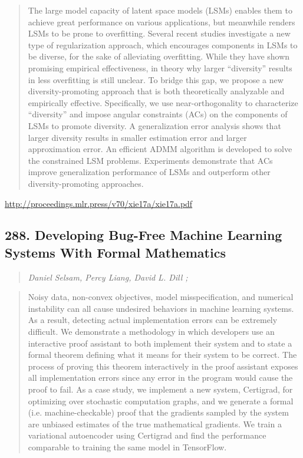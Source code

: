 \documentclass{article}
\begin{document}
\begin{quote}
    The large model capacity of latent space models (LSMs) enables them to achieve great performance on various applications, but meanwhile renders LSMs to be prone to overfitting. Several recent studies investigate a new type of regularization approach, which encourages components in LSMs to be diverse, for the sake of alleviating overfitting. While they have shown promising empirical effectiveness, in theory why larger “diversity” results in less overfitting is still unclear. To bridge this gap, we propose a new diversity-promoting approach that is both theoretically analyzable and empirically effective. Specifically, we use near-orthogonality to characterize “diversity” and impose angular constraints (ACs) on the components of LSMs to promote diversity. A generalization error analysis shows that larger diversity results in smaller estimation error and larger approximation error. An efficient ADMM algorithm is developed to solve the constrained LSM problems. Experiments demonstrate that ACs improve generalization performance of LSMs and outperform other diversity-promoting approaches.  \end{quote}

\href{http://proceedings.mlr.press/v70/xie17a/xie17a.pdf}{http://proceedings.mlr.press/v70/xie17a/xie17a.pdf}

\subsection{288. Developing Bug-Free Machine Learning Systems With Formal Mathematics}

\begin{quote}
\footnotesize{\textit{Daniel Selsam, Percy Liang, David L. Dill ;}}
\end{quote}

\begin{quote}
    Noisy data, non-convex objectives, model misspecification, and numerical instability can all cause undesired behaviors in machine learning systems. As a result, detecting actual implementation errors can be extremely difficult. We demonstrate a methodology in which developers use an interactive proof assistant to both implement their system and to state a formal theorem defining what it means for their system to be correct. The process of proving this theorem interactively in the proof assistant exposes all implementation errors since any error in the program would cause the proof to fail. As a case study, we implement a new system, Certigrad, for optimizing over stochastic computation graphs, and we generate a formal (i.e. machine-checkable) proof that the gradients sampled by the system are unbiased estimates of the true mathematical gradients. We train a variational autoencoder using Certigrad and find the performance comparable to training the same model in TensorFlow.  \end{quote}
\end{document}
